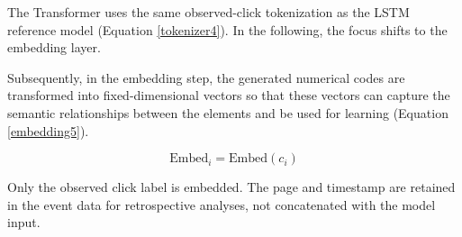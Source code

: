 \documentclass[sn-mathphys-num, Numbered]{sn-jnl}%
\theoremstyle{thmstyleone}%
\theoremstyle{thmstyletwo}%
\theoremstyle{thmstylethree}%
\begin{document}






The Transformer uses the same observed-click tokenization as the LSTM reference model (Equation \ref{tokenizer4}).
In the following, the focus shifts to the embedding layer.

Subsequently, in the embedding step, the generated numerical codes are transformed into fixed-dimensional vectors so that these vectors can capture the semantic relationships between the elements and be used for learning (Equation \ref{embedding5}).

\begin{equation}\label{embedding5}
	\mathrm{Embed}_i = \mathrm{Embed}(c_i) 
\end{equation}

Only the observed click label is embedded. The page and timestamp are retained in the event data for retrospective analyses, not concatenated with the model input.
\end{document}
